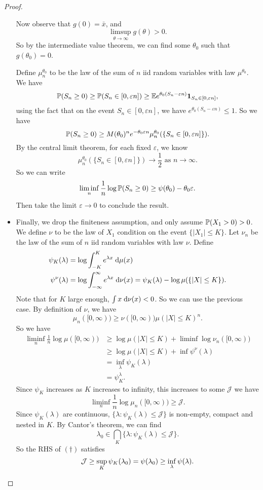 \documentclass[a4paper]{article}
\begin{document}
\begin{proof}
\begin{itemize}
      Now observe that $g(0) = \bar{x}$, and
      \[
        \limsup_{\theta \to \infty} g(\theta) > 0.
      \]
      So by the intermediate value theorem, we can find some $\theta_0$ such that $g(\theta_0) = 0$.

      Define $\mu^{\theta_0}_n$ to be the law of the sum of $n$ iid random variables with law $\mu^{\theta_0}$. We have
      \[
        \P(S_n \geq 0) \geq \P(S_n \in [0, \varepsilon n]) \geq \E e^{\theta_0(S_n - \varepsilon n)} \mathbf{1}_{S_n \in [0, \varepsilon n]},
      \]
      using the fact that on the event $S_n \in [0, \varepsilon n]$, we have $e^{\theta_0 (S_n - \varepsilon n)} \leq 1$. So we have
      \[
        \P(S_n \geq 0) \geq M(\theta_0)^n e^{-\theta_0 \varepsilon n} \mu_n^{\theta_0} (\{S_n \in [0, \varepsilon n]\}).
      \]
      By the central limit theorem, for each fixed $\varepsilon$, we know
      \[
        \mu_n^{\theta_0} (\{S_n \in [0, \varepsilon n]\}) \to \frac{1}{2}\text{ as }n \to \infty.
      \]
      So we can write
      \[
        \liminf_n \frac{1}{n} \log \P(S_n \geq 0) \geq \psi(\theta_0) - \theta_0 \varepsilon.
      \]
      Then take the limit $\varepsilon \to 0$ to conclude the result.
    \item Finally, we drop the finiteness assumption, and only assume $\P(X_1 > 0) > 0$. We define $\nu$ to be the law of $X_1$ condition on the event $\{|X_1| \leq K\}$. Let $\nu_n$ be the law of the sum of $n$ iid random variables with law $\nu$. Define
      \begin{align*}
        \psi_K(\lambda) &= \log \int_{-K}^K e^{\lambda x} \;\d \mu(x)\\
        \psi^\nu(\lambda) &= \log \int_{-\infty}^\infty e^{\lambda x} \;\d \nu(x) = \psi_K(\lambda) - \log \mu (\{|X| \leq K\}).
      \end{align*}
      Note that for $K$ large enough, $\int x \;\d \nu(x) < 0$. So we can use the previous case. By definition of $\nu$, we have
      \[
        \mu_n([0, \infty)) \geq \nu([0, \infty)) \mu(|X| \leq K)^n.
      \]
      So we have
      \begin{align*}
        \liminf_n \frac{1}{n} \log \mu([0, \infty)) &\geq \log \mu(|X| \leq K) + \liminf \log \nu_n([0, \infty))\\
        &\geq \log \mu(|X| \leq K) + \inf \psi^\nu (\lambda)\\
        &= \inf_\lambda \psi_K(\lambda)\\
        &= \psi_K^\lambda.
      \end{align*}
      Since $\psi_K$ increases as $K$ increases to infinity, this increases to some $\mathcal{J}$ we have
      \[
        \liminf_n \frac{1}{n} \log \mu_n([0, \infty)) \geq \mathcal{J}.\tag{$\dagger$}
      \]
      Since $\psi_K(\lambda)$ are continuous, $\{\lambda: \psi_K (\lambda) \leq \mathcal{J}\}$ is non-empty, compact and nested in $K$. By Cantor's theorem, we can find
      \[
        \lambda_0 \in \bigcap_K \{\lambda: \psi_K(\lambda) \leq \mathcal{J}\}.
      \]
      So the RHS of $(\dagger)$ satisfies
      \[
        \mathcal{J} \geq \sup_K \psi_K(\lambda _0) = \psi(\lambda_0) \geq \inf_\lambda \psi(\lambda).\qedhere
      \]%
  \end{itemize}
\end{proof}
\printindex
\end{document}
